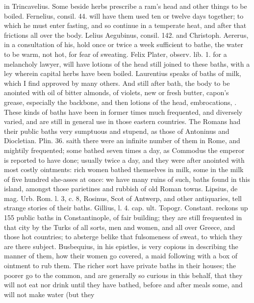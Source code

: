 {in Trincavelius. Some beside herbs prescribe a ram's head and other
things to be boiled.  Fernelius, consil. 44. will have them used
ten or twelve days together; to which he must enter fasting, and so
continue in a temperate heat, and after that frictions all over the
body. Lelius Aegubinus, consil. 142. and Christoph. Aererus, in a
consultation of his, hold once or twice a week sufficient to bathe, the
water to be warm, not hot, for fear of sweating. Felix Plater,
observ. lib. 1. for a melancholy lawyer,  will have lotions of
the head still joined to these baths, with a ley wherein capital herbs
have been boiled. Laurentius speaks of baths of milk, which I
find approved by many others. And still after bath, the body to be
anointed with oil of bitter almonds, of violets, new or fresh butter,
capon's grease, especially the backbone, and then lotions of the
head, embrocations, \etc{}. These kinds of baths have been in former times
much frequented, and diversely varied, and are still in general use in
those eastern countries. The Romans had their public baths very
sumptuous and stupend, as those of Antoninus and Diocletian. Plin. 36.
saith there were an infinite number of them in Rome, and mightily
frequented; some bathed seven times a day, as Commodus the emperor is
reported to have done; usually twice a day, and they were after
anointed with most costly ointments: rich women bathed themselves in
milk, some in the milk of five hundred she-asses at once: we have many
ruins of such, baths found in this island, amongst those parietines and
rubbish of old Roman towns. Lipsius, de mag. Urb. Rom. l. 3, c. 8,
Rosinus, Scot of Antwerp, and other antiquaries, tell strange stories
of their baths. Gillius, l. 4. cap. ult. Topogr. Constant. reckons up
155 public baths in Constantinople, of fair building; they are
still frequented in that city by the Turks of all sorts, men and
women, and all over Greece, and those hot countries; to absterge belike
that fulsomeness of sweat, to which they are there subject.
Busbequius, in his epistles, is very copious in describing the
manner of them, how their women go covered, a maid following with a box
of ointment to rub them. The richer sort have private baths in their
houses; the poorer go to the common, and are generally so curious in
this behalf, that they will not eat nor drink until they have bathed,
before and after meals some, and will not make water (but they
}
